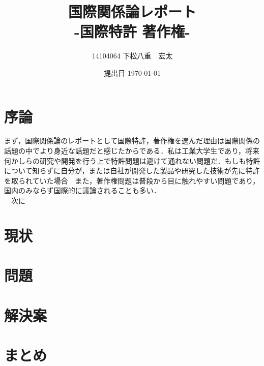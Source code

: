 \documentclass[11pt,a4paper]{jsarticle}
\begin{document}
\title{国際関係論レポート \\ -国際特許 著作権-}
\author{14104064 下松八重　宏太}
\date{提出日 \today}



\maketitle
\thispagestyle{empty}
\newpage


\section{序論}
まず，国際関係論のレポートとして国際特許，著作権を選んだ理由は国際関係の話題の中でより身近な話題だと感じたからである．私は工業大学生であり，将来何かしらの研究や開発を行う上で特許問題は避けて通れない問題だ．もしも特許について知らずに自分が，または自社が開発した製品や研究した技術が先に特許を取られていた場合　また，著作権問題は普段から目に触れやすい問題であり，国内のみならず国際的に議論されることも多い． \\
　次に
\section{現状}

\section{問題}

\section{解決案}

\section{まとめ}
\end{document}

